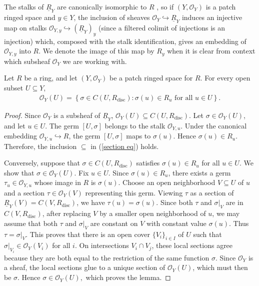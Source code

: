 \documentclass[11pt]{amsart}
\def\O{{\mathcal{O}}}
\begin{document}
The stalks of $\underline R_Y$ are canonically isomorphic
to $R$ \cite[\href{https://stacks.math.columbia.edu/tag/007B}{Tag 007B}]{stacks-project}, so if $(Y,\mathcal O_Y)$ is a patch ringed space and $y \in Y$, the inclusion of sheaves $\mathcal{O}_Y\hookrightarrow \underline R_Y$ induces an injective map on stalks $\mathcal{O}_{Y,y}\hookrightarrow (\underline R_Y)_y$ (since a filtered colimit of injections is an injection) which, composed with the stalk identification, gives an embedding of $\mathcal O_{Y,y}$ into $R$. We denote the image of this map  by $R_y$ when it is clear from context which subsheaf $\O_Y$ we are working with.


\begin{lemma} \label{lem: rep}
Let $R$ be a ring, and let $(Y,\mathcal O_Y)$ be a patch ringed space for $R$. For every open subset $U\subseteq Y$,
\begin{eqnarray}\label{section eq}\mathcal O_Y(U)=
\left\{\sigma\in C(U,R_{\mathrm{disc}}):
\sigma(u)\in R_u \text{ for all } u\in U \right\}.\end{eqnarray}
\end{lemma}

\begin{proof}
Since $\mathcal O_Y$ is a subsheaf of $\underline R_Y$, $\mathcal O_Y(U) \subseteq C(U,R_{\mathrm{disc}})$.
 Let
\(\sigma\in\mathcal O_Y(U)\), and let \(u\in U\). The germ
$[U,\sigma]$ belongs to the stalk $\mathcal O_{Y,u}$. Under the canonical embedding $\mathcal O_{Y,u}\hookrightarrow R$, the germ $[U,\sigma]$ maps to $\sigma(u)$. Hence $\sigma(u)\in R_u.$ Therefore, the inclusion $\subseteq$ in  (\ref{section eq}) holds. 

Conversely, suppose that $\sigma\in C(U,R_{\mathrm{disc}})$
satisfies $\sigma(u)\in R_u$ for all $u\in U.$
We show that $\sigma\in\mathcal O_Y(U)$. Fix $u\in U$. Since
$\sigma(u)\in R_u$, there exists a germ $
\tau_u \in\mathcal O_{Y,u}$
whose image in $R$ is $\sigma(u)$. Choose an open neighborhood
$V\subseteq U$ of $u$ and a section
$
\tau \in\mathcal O_Y(V)$
representing this germ. Viewing $\tau$ as a section of
$\underline R_Y(V)=C(V,R_{\mathrm{disc}})$, we have $\tau(u)=\sigma(u).$
Since both $\tau$ and $\sigma|_V$ are in $C(V,R_{\mathrm{disc}})$, after replacing $V$ by a smaller open neighborhood of
$u$, we may assume  that both $\tau$ and $\sigma|_V$ are constant
on $V$ with constant value $\sigma(u)$. Thus
$\tau=\sigma|_V$. This proves that there is an open cover
$\{V_i\}_{i\in I}$ of $U$ such that $\sigma|_{V_i}\in \mathcal O_Y(V_i)$
for all $i$. On intersections $V_i\cap V_j$, these local sections agree because they are both equal to the restriction of the same function $\sigma$. Since $\mathcal O_Y$ is a sheaf, the local sections glue to a unique section of $\mathcal O_Y(U)$, which must then be $\sigma$. Hence $\sigma\in\mathcal O_Y(U),$
which proves the lemma.
\end{proof}
\end{document}
